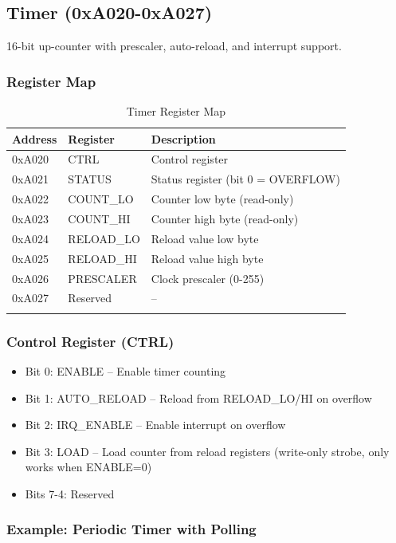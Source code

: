 \documentclass[11pt,a4paper]{article}
\begin{document}
\subsection{Timer (0xA020-0xA027)}

16-bit up-counter with prescaler, auto-reload, and interrupt support.

\subsubsection{Register Map}

\begin{longtable}{lll}
\toprule
\textbf{Address} & \textbf{Register} & \textbf{Description} \\
\midrule
\endhead
0xA020 & CTRL & Control register \\
0xA021 & STATUS & Status register (bit 0 = OVERFLOW) \\
0xA022 & COUNT\_LO & Counter low byte (read-only) \\
0xA023 & COUNT\_HI & Counter high byte (read-only) \\
0xA024 & RELOAD\_LO & Reload value low byte \\
0xA025 & RELOAD\_HI & Reload value high byte \\
0xA026 & PRESCALER & Clock prescaler (0-255) \\
0xA027 & Reserved & -- \\
\bottomrule
\caption{Timer Register Map}
\end{longtable}

\subsubsection{Control Register (CTRL)}

\begin{itemize}
    \item Bit 0: ENABLE -- Enable timer counting
    \item Bit 1: AUTO\_RELOAD -- Reload from RELOAD\_LO/HI on overflow
    \item Bit 2: IRQ\_ENABLE -- Enable interrupt on overflow
    \item Bit 3: LOAD -- Load counter from reload registers (write-only strobe, only works when ENABLE=0)
    \item Bits 7-4: Reserved
\end{itemize}

\subsubsection{Example: Periodic Timer with Polling}
\end{document}
